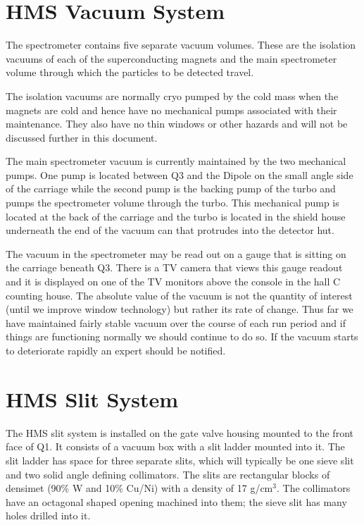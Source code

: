 {\section{HMS Vacuum System}

	The spectrometer contains five separate vacuum volumes.
These are the isolation vacuums of each of the superconducting
magnets and the main spectrometer volume through which the particles
to be detected travel.

The isolation vacuums are normally cryo pumped by the cold mass when the
magnets are cold and hence have no mechanical pumps
associated with their maintenance. They also have no thin
windows or other hazards and will not be discussed further in this document.

The main spectrometer vacuum
is currently maintained by the two mechanical pumps.
One pump is located between Q3 and the Dipole on the small angle
side of the carriage while the second pump is the backing
pump of the turbo and pumps the spectrometer volume through the turbo.
This mechanical pump is located
at the back of the carriage and the turbo is located in the shield house
underneath the end of the vacuum can that protrudes into the detector hut.

The vacuum in the spectrometer may be read out on a gauge that is sitting on the
carriage beneath Q3. There is a TV camera that views this gauge readout and
it is displayed on one of the TV monitors above the console in the hall
C counting house. The absolute value of the vacuum is not the quantity
of interest (until we improve window technology) but rather its rate of change.
Thus far we have maintained fairly stable vacuum over the course of each run
period and if things are functioning normally we should continue to do so.
If the vacuum starts to deteriorate rapidly an expert should be notified.



\section{HMS Slit System}
\label{sec:hms_slit}

The HMS slit system is installed on the gate valve housing mounted to the
front face of Q1. It consists of a vacuum box with a slit ladder
mounted into it. The slit ladder has space for three separate slits,
which will typically be one sieve slit and two solid angle defining collimators.
The slits are rectangular blocks of densimet (90\% W and 10\% Cu/Ni)
with a density of 17 g/cm$^3$. The collimators have an octagonal shaped
opening machined into them; the sieve slit has many holes drilled
into it.

}
